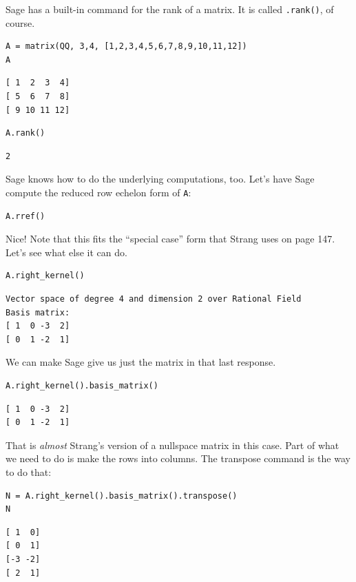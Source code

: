 \documentclass[10pt,]{book}
\theoremstyle{plain}
\numberwithin{equation}{section}
\begin{document}
      Sage has a built-in command for the rank of a matrix. It is called
      \verb?.rank()?, of course.
\begin{lstlisting}[style=sageinput]
A = matrix(QQ, 3,4, [1,2,3,4,5,6,7,8,9,10,11,12])
A
\end{lstlisting}
\begin{lstlisting}[style=sageoutput]
[ 1  2  3  4]
[ 5  6  7  8]
[ 9 10 11 12]
\end{lstlisting}
\begin{lstlisting}[style=sageinput]
A.rank()
\end{lstlisting}
\begin{lstlisting}[style=sageoutput]
2
\end{lstlisting}
\par

      Sage knows how to do the underlying computations, too. Let's have Sage
      compute the reduced row echelon form of \verb?A?:
\begin{lstlisting}[style=sageinput]
A.rref()
\end{lstlisting}
\par

      Nice! Note that this fits the ``special case'' form that Strang uses on
      page 147. Let's see what else it can do.
\begin{lstlisting}[style=sageinput]
A.right_kernel()
\end{lstlisting}
\begin{lstlisting}[style=sageoutput]
Vector space of degree 4 and dimension 2 over Rational Field
Basis matrix:
[ 1  0 -3  2]
[ 0  1 -2  1]
\end{lstlisting}
\par

      We can make Sage give us just the matrix in that last response.
\begin{lstlisting}[style=sageinput]
A.right_kernel().basis_matrix()
\end{lstlisting}
\begin{lstlisting}[style=sageoutput]
[ 1  0 -3  2]
[ 0  1 -2  1]
\end{lstlisting}
\par

      That is \emph{almost} Strang's version of a nullspace matrix in this case.
      Part of what we need to do is make the rows into columns. The transpose command is
      the way to do that:
\begin{lstlisting}[style=sageinput]
N = A.right_kernel().basis_matrix().transpose()
N
\end{lstlisting}
\begin{lstlisting}[style=sageoutput]
[ 1  0]
[ 0  1]
[-3 -2]
[ 2  1]
\end{lstlisting}
\par
\end{document}
